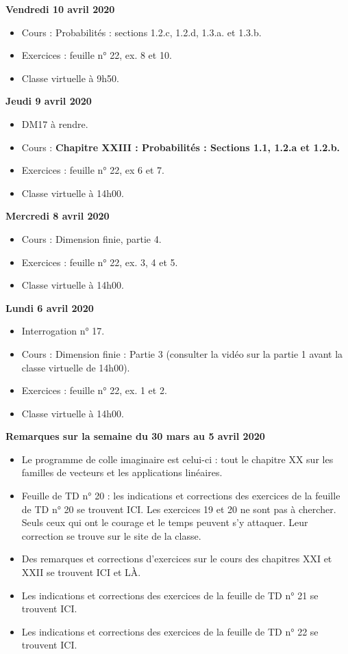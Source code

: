 \documentclass[12pt,a4paper]{article}
\begin{document}
\noindent\textbf{\bf Vendredi 10 avril 2020}
\begin{itemize}
\item Cours : Probabilités : sections 1.2.c, 1.2.d, 1.3.a. et 1.3.b.
\item Exercices : feuille n° 22, ex. 8 et 10.
\item Classe virtuelle à 9h50.\vspace{.4cm}
\end{itemize}

\noindent\textbf{Jeudi 9 avril 2020}
\begin{itemize}
\item DM17 à rendre.
\item Cours : \bf Chapitre XXIII \rm : Probabilités : Sections 1.1, 1.2.a et 1.2.b.
\item Exercices : feuille n° 22, ex 6 et 7.
\item Classe virtuelle à 14h00.\vspace{.4cm}
\end{itemize}

\noindent\textbf{Mercredi 8 avril 2020}
\begin{itemize}
\item Cours : Dimension finie, partie 4.
\item Exercices : feuille n° 22, ex. 3, 4 et 5.
\item Classe virtuelle à 14h00.\vspace{.4cm}
\end{itemize}

\noindent\textbf{\bf Lundi 6 avril 2020}
\begin{itemize}
\item Interrogation n° 17.
\item Cours : Dimension finie : Partie 3 (consulter la vidéo sur la partie 1 avant la classe virtuelle de 14h00).
\item Exercices : feuille n° 22, ex. 1 et 2.
\item Classe virtuelle à 14h00.\vspace{.4cm}
\end{itemize}


\noindent\textbf{\bf Remarques sur la semaine du 30 mars au 5 avril 2020}
\begin{itemize}
\item Le programme de colle imaginaire est celui-ci : tout le chapitre XX sur les familles de vecteurs et les applications linéaires.
\item Feuille de TD n° 20 : les indications et corrections des exercices de la feuille de TD n° 20 se trouvent ICI. Les exercices 19 et 20 ne sont pas à chercher. Seuls ceux qui ont le courage et le temps peuvent s'y attaquer. Leur correction se trouve sur le site de la classe.
\item Des remarques et corrections d'exercices sur le cours des chapitres XXI et XXII se trouvent ICI et LÀ.
\item Les indications et corrections des exercices de la feuille de TD n° 21 se trouvent ICI.
\item Les indications et corrections des exercices de la feuille de TD n° 22 se trouvent ICI.\vspace{.4cm}
\end{itemize}
\end{document}
